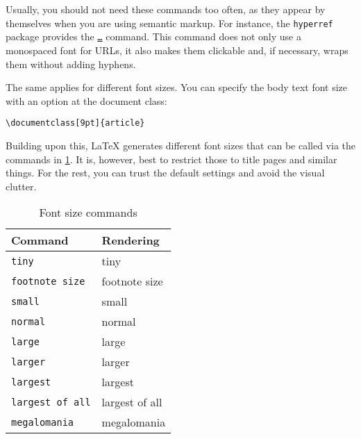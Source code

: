 Usually, you should not need these commands too often, as they appear by themselves when you are using semantic markup.
For instance, the \texttt{hyperref} package provides the \texttt{\url{…}} command.
This command does not only use a monospaced font for \textsc{URL}s, it also makes them clickable and, if necessary, wraps them without adding hyphens.

The same applies for different font sizes.
You can specify the body text font size with an option at the document class:
\begin{verbatim}
\documentclass[9pt]{article}
\end{verbatim}
Building upon this, \LaTeX{} generates different font sizes that can be called via the commands in \cref{tbl:type-sizes}.
It is, however, best to restrict those to title pages and similar things.
For the rest, you can trust the default settings and avoid the visual clutter.

\begin{table}[H]
	\center
	\begin{tabular}{ll}
		\toprule
		Command & Rendering \\
		\midrule
		\texttt{{\tiny tiny}} & {\tiny tiny} \\
		\texttt{{\footnotesize footnote size}} & {\footnotesize footnote size} \\
		\texttt{{\small small}} & {\small small} \\
		\texttt{{\normalsize normal}} & {\normalsize normal} \\
		\texttt{{\large large}} & {\large large} \\
		\texttt{{\Large larger}} & {\Large larger} \\
		\texttt{{\LARGE largest}} & {\LARGE largest} \\
		\texttt{{\huge largest of all}} & {\huge largest of all} \\
		\texttt{{\Huge megalomania}} & {\Huge megalomania} \\
		\bottomrule
	\end{tabular}
	\caption{Font size commands}
	\label{tbl:type-sizes}
\end{table}


